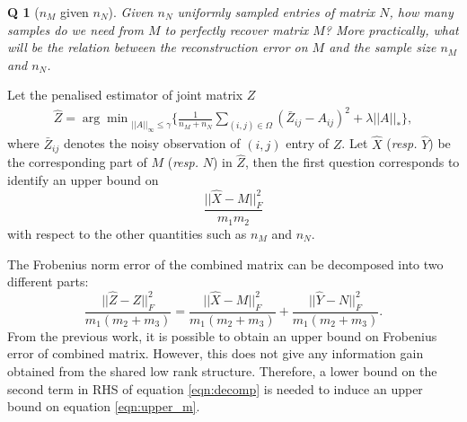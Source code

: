 \documentclass{article} %
\newtheorem{question}{Q}
\begin{document}
\begin{question}[$n_M$ given $n_N$]
Given $n_N$ uniformly sampled entries of matrix $N$, how many samples do we need from $M$ to perfectly recover matrix $M$? More practically, what will be the relation between the reconstruction error on $M$ and the sample size $n_M$ and $n_N$.
\end{question}
Let the penalised estimator of joint matrix $Z$
\begin{align}
\label{eqn:z_estimator}
\hat{Z} = {\arg\min}_{||{A}||_\infty \leq \gamma} \bigg\{\frac{1}{n_M + n_N} \sum_{(i,j) \in \Omega}(\bar{Z}_{ij} - {A}_{ij})^2 + \lambda ||{A}||_* \bigg\},
\end{align}
where $\bar{Z}_{ij}$ denotes the noisy observation of $(i,j)$ entry of $Z$. Let $\hat{X}$ (\textit{resp.} $\hat{Y}$) be the corresponding part of $M$ (\textit{resp.} $N$) in $\hat{Z}$, then the first question corresponds to identify an upper bound on
\begin{equation}
\label{eqn:upper_m}
\frac{||\hat{X} - M||_F^2}{m_1m_2}
\end{equation}
with respect to the other quantities such as $n_M$ and $n_N$.

The Frobenius norm error of the combined matrix can be decomposed into two different parts:
\begin{equation}
\label{eqn:decomp}
\frac{||\hat{Z} - Z||_F^2}{m_1(m_2+m_3)} = \frac{||\hat{X} - M||_F^2}{m_1(m_2+m_3)} + \frac{||\hat{Y} - N||_F^2}{m_1(m_2+m_3)}.
\end{equation}
From the previous work, it is possible to obtain an upper bound on Frobenius error of combined matrix. However, this does not give any information gain obtained from the shared low rank structure. Therefore, a lower bound on the second term in RHS of equation \ref{eqn:decomp} is needed to induce an upper bound on equation \ref{eqn:upper_m}.
\end{document}
